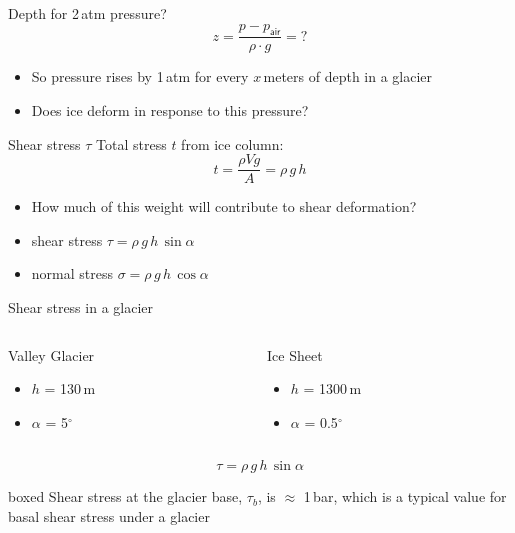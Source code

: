 \documentclass[hide notes,intlimits,unknownkeysallowed]{beamer}
\begin{document}
\begin{frame}{Depth for 2\,atm pressure?}
    \begin{displaymath}
       z = \frac{p-p_{\textsf{air}}}{\rho\cdot g} = ?
     \end{displaymath}
     \begin{itemize}
     \item  So pressure rises by 1\,atm for every \alert{$x$}\,meters of depth in a glacier
     \item Does ice deform in response to this pressure?
     \end{itemize}
\end{frame}


\begin{frame}{Shear stress $\tau$}
  Total stress $t$ from ice column:
    \begin{displaymath}
       t = \frac{\rho V g}{A} = \rho\,g\,h
     \end{displaymath}
     \begin{itemize}
     \item How much of this weight will contribute to shear deformation?
     \item shear stress $\tau = \rho\,g\,h\,\sin{\alpha}$
     \item normal stress $\sigma = \rho\,g\,h\,\cos{\alpha}$
    \end{itemize}
\end{frame}


\begin{frame}{Shear stress in a glacier}
\begin{columns}[c]
  \begin{column}{.5\textwidth}
    \begin{block}{Valley Glacier}
      \begin{itemize}
      \item $h$ = 130\,m
      \item $\alpha$ = 5$^{\circ}$
      \end{itemize}
    \end{block}
  \end{column}
  \begin{column}{.5\textwidth}
    \begin{block}{Ice Sheet}
  \begin{itemize}
  \item $h$ = 1300\,m
  \item $\alpha$ = 0.5$^{\circ}$
  \end{itemize}
\end{block}
\end{column}
\end{columns}
\vspace{1em}
\begin{displaymath}
    \tau = \rho\,g\,h\,\sin{\alpha}
  \end{displaymath}
  \begin{beamercolorbox}[rounded=true,shadow=true]{boxed}
    Shear stress at the glacier base, $\tau_{b}$, is $\approx$ 1\,bar, which is a typical value for basal shear stress under a glacier
  \end{beamercolorbox}
\end{frame}
   
\end{document}
